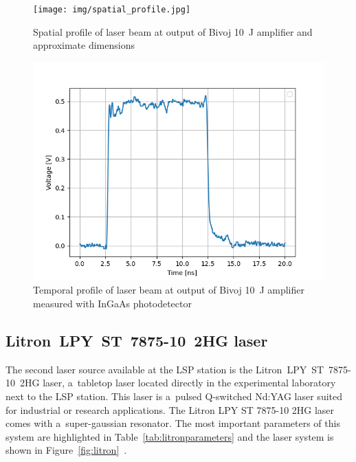 \begin{figure}[h]
    \centering
    \texttt{[image: img/spatial\_profile.jpg]}
    \caption[Spatial profile of laser beam at output of Bivoj \SI{10}{\joule} amplifier]{Spatial profile of laser beam at output of Bivoj \SI{10}{\joule} amplifier and approximate dimensions \protect\cite{kaufman}}
    \label{fig:spatialprofile}
\end{figure}

\begin{figure}[h]
    \centering
    \includegraphics[width=0.6\linewidth]{img/temporal_profile_bivoj_v_2.png}
    \caption[Temporal profile of laser beam at output of Bivoj \SI{10}{\joule}]{Temporal profile of laser beam at output of Bivoj \SI{10}{\joule} amplifier measured with InGaAs photodetector \protect\cite{kaufman}}
    \label{fig:temporalprofile}
\end{figure}

\subsection{Litron~LPY~ST~7875-10~2HG laser}

The second laser source available at the LSP station is the Litron~LPY~ST~7875-10~2HG laser, a~tabletop laser located directly in the experimental laboratory next to the LSP station. This laser is a~pulsed Q-switched Nd:YAG laser suited for industrial or research applications. The Litron  LPY ST 7875-10 2HG laser comes with a~super-gaussian resonator. The most important parameters of this system are highlighted in Table~\ref{tab:litronparameters} and the laser system is shown in Figure~\ref{fig:litron}~\cite{litron}. 


